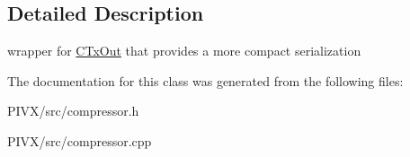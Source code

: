 \subsection{Detailed Description}
wrapper for \mbox{\hyperlink{class_c_tx_out}{C\+Tx\+Out}} that provides a more compact serialization 

The documentation for this class was generated from the following files\+:\begin{DoxyCompactItemize}
\item 
P\+I\+V\+X/src/compressor.\+h\item 
P\+I\+V\+X/src/compressor.\+cpp\end{DoxyCompactItemize}
